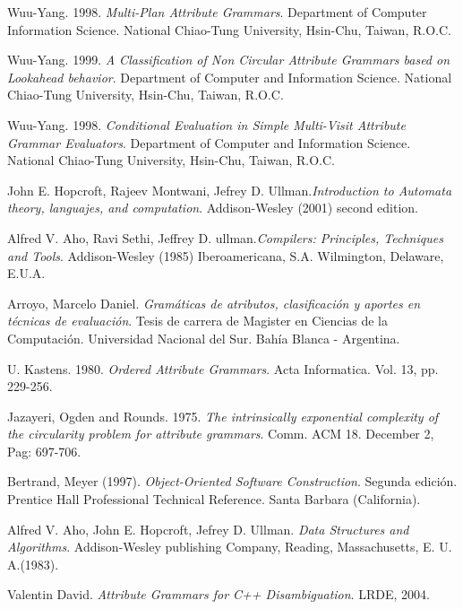 
\begin{thebibliography}{10}

 Wuu-Yang. 1998. \textit{Multi-Plan Attribute Grammars}. Department of Computer Information Science. National Chiao-Tung University, Hsin-Chu, Taiwan, R.O.C.

 Wuu-Yang. 1999. \textit{A Classification of Non Circular Attribute Grammars based on Lookahead behavior}. Department of Computer and Information Science. National Chiao-Tung University, Hsin-Chu, Taiwan, R.O.C.

 Wuu-Yang. 1998. \textit{Conditional Evaluation in Simple Multi-Visit Attribute Grammar Evaluators}. Department of Computer and Information Science. National
Chiao-Tung University, Hsin-Chu, Taiwan, R.O.C.

 John E. Hopcroft, Rajeev Montwani, Jefrey D. Ullman.\textit{Introduction to Automata theory, languajes, and computation}. Addison-Wesley (2001) second edition.

 Alfred V. Aho, Ravi Sethi, Jeffrey D. ullman.\textit{Compilers: Principles, Techniques and Tools}. Addison-Wesley (1985)  Iberoamericana, S.A. Wilmington, Delaware, E.U.A.

 Arroyo, Marcelo Daniel. \textit{Gramáticas de atributos, clasificación y aportes en técnicas de evaluación}. Tesis de carrera de Magister en Ciencias de la Computación. Universidad Nacional del Sur. Bahía Blanca - Argentina.

 U. Kastens. 1980. \textit{Ordered Attribute Grammars}. Acta Informatica. Vol. 13, pp. 229-256.

 Jazayeri, Ogden and Rounds. 1975. \emph{The intrinsically 
exponential complexity of the circularity problem for attribute grammars}. 
Comm. ACM 18. December 2, Pag: 697-706.

 Bertrand, Meyer (1997). \textit{Object-Oriented Software Construction}. Segunda edición. Prentice Hall Professional Technical Reference. Santa Barbara (California).

 Alfred V. Aho, John E. Hopcroft, Jefrey D. Ullman. \textit{Data Structures and Algorithms}. Addison-Wesley publishing Company, Reading, Massachusetts, E. U. A.(1983).

 Valentin David. \textit{Attribute Grammars for C++ Disambiguation}. LRDE, 2004.


\end{thebibliography}
